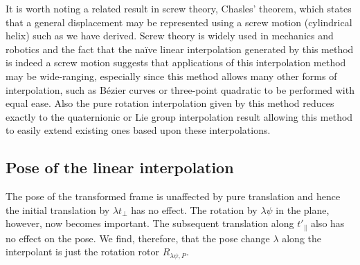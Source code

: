It is worth noting a related result in screw theory, Chasles' theorem, which
states that a general displacement may be represented using a screw motion
(cylindrical helix) such as we have derived. Screw theory is widely used in
mechanics and robotics and the fact that the na\"ive linear interpolation
generated by this method is indeed a screw motion suggests that
applications of this interpolation method may be wide-ranging, especially since
this method allows many other forms of interpolation, such as B\'ezier curves
or three-point quadratic to be performed with equal ease. Also the pure
rotation interpolation given by this method reduces exactly to the quaternionic
or Lie group interpolation result allowing this method to easily extend
existing ones based upon these interpolations.

\subsection{Pose of the linear interpolation}

The pose of the transformed frame is unaffected by pure translation and hence the initial
translation by $\lambda t_\perp$ has no effect. The rotation by $\lambda \psi$ in the plane,
however, now becomes important. The subsequent translation along $t'_\parallel$ also has
no effect on the pose. We find, therefore, that the pose change $\lambda$ along the 
interpolant is just the rotation rotor $R_{\lambda \psi, P}$.
